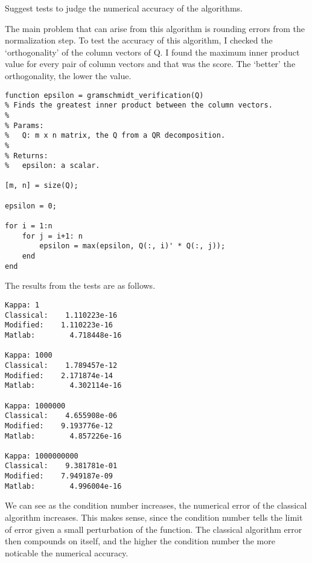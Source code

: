 \documentclass[12pt]{article}
\newenvironment{exercise}[2][Exercise]{\begin{trivlist}
\item[\hskip \labelsep{\bfseries #1}\hskip \labelsep{\bfseries #2.}]}{\end{trivlist}}
\begin{document}
\begin{exercise}{3} Suggest tests to judge the numerical accuracy of the algorithms.

    \noindent The main problem that can arise from this algorithm is rounding errors from the normalization step. 
    To test the accuracy of this algorithm, I checked the `orthogonality' of the column vectors of Q. 
    I found the maximum inner product value for every pair of column vectors and that was the score.
    The `better' the orthogonality, the lower the value.

    \begin{verbatim}
function epsilon = gramschmidt_verification(Q)
% Finds the greatest inner product between the column vectors.
%
% Params:
%   Q: m x n matrix, the Q from a QR decomposition.
%
% Returns:
%   epsilon: a scalar.

[m, n] = size(Q);

epsilon = 0;

for i = 1:n
    for j = i+1: n
        epsilon = max(epsilon, Q(:, i)' * Q(:, j));
    end
end
    \end{verbatim}

    \noindent The results from the tests are as follows.

    \begin{verbatim}
Kappa: 1
Classical:    1.110223e-16
Modified:    1.110223e-16
Matlab:        4.718448e-16

Kappa: 1000
Classical:    1.789457e-12
Modified:    2.171874e-14
Matlab:        4.302114e-16

Kappa: 1000000
Classical:    4.655908e-06
Modified:    9.193776e-12
Matlab:        4.857226e-16

Kappa: 1000000000
Classical:    9.381781e-01
Modified:    7.949187e-09
Matlab:        4.996004e-16
    \end{verbatim}

    \noindent We can see as the condition number increases, the numerical error of the classical algorithm increases.
    This makes sense, since the condition number tells the limit of error given a small perturbation of the function.
    The classical algorithm error then compounds on itself, and the higher the condition number the more noticable the numerical accuracy.

\end{exercise}
\end{document}
